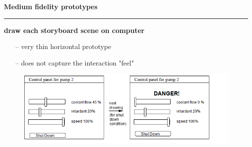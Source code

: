 \documentclass[pdf]{beamer}
\begin{document}
\begin{frame}
\vspace{8mm}
\textcolor{myBlue}{\textbf{\Large{Medium fidelity prototypes}}}

\textcolor{red}{\rule{10cm}{1mm}}

\textbf{draw each storyboard scene on computer
}
\begin{itemize}
\item [--]very thin horizontal prototype
\item[--] does not capture the interaction "feel"
\end{itemize}

\begin{figure}
	\includegraphics[width=10 cm]{30_Picture1.png}
\end{figure}
\end{frame}
\end{document}
